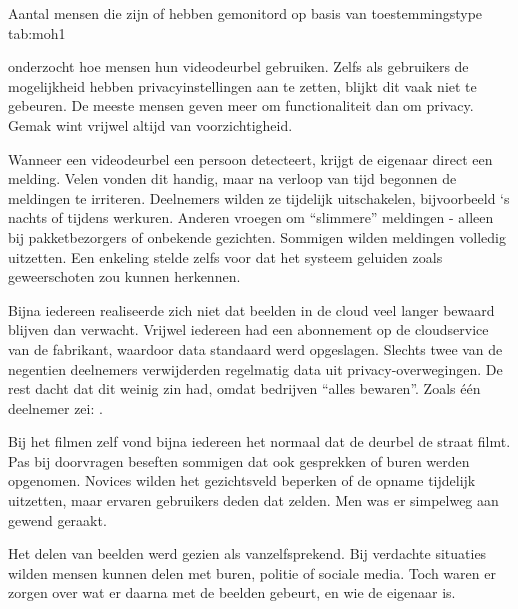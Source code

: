 \documentclass[nonacm, sigconf]{acmart}
\begin{document}
    \begin{SimpleTable}[s{0.3}s{0.3}s{0.3}s{0.3}]{Aantal mensen die zijn of hebben gemonitord op basis van toestemmingstype \parencite{moh2023characterizing}}{tab:moh1}
        \TableEmpty{}
    \end{SimpleTable}

    \parencite{tabassum2023exploring} onderzocht hoe mensen hun videodeurbel gebruiken.
    Zelfs als gebruikers de mogelijkheid hebben privacyinstellingen aan te zetten, blijkt dit vaak niet te gebeuren.
    De meeste mensen geven meer om functionaliteit dan om privacy.
    Gemak wint vrijwel altijd van voorzichtigheid.

    Wanneer een videodeurbel een persoon detecteert, krijgt de eigenaar direct een melding.
    Velen vonden dit handig, maar na verloop van tijd begonnen de meldingen te irriteren.
    Deelnemers wilden ze tijdelijk uitschakelen, bijvoorbeeld `s nachts of tijdens werkuren.
    Anderen vroegen om ``slimmere'' meldingen - alleen bij pakketbezorgers of onbekende gezichten.
    Sommigen wilden meldingen volledig uitzetten.
    Een enkeling stelde zelfs voor dat het systeem geluiden zoals geweerschoten zou kunnen herkennen.

    Bijna iedereen realiseerde zich niet dat beelden in de cloud veel langer bewaard blijven dan verwacht.
    Vrijwel iedereen had een abonnement op de cloudservice van de fabrikant, waardoor data standaard werd opgeslagen.
    Slechts twee van de negentien deelnemers verwijderden regelmatig data uit privacy-overwegingen.
    De rest dacht dat dit weinig zin had, omdat bedrijven ``alles bewaren''.
    Zoals één deelnemer zei:
    .

    Bij het filmen zelf vond bijna iedereen het normaal dat de deurbel de straat filmt.
    Pas bij doorvragen beseften sommigen dat ook gesprekken of buren werden opgenomen.
    Novices wilden het gezichtsveld beperken of de opname tijdelijk uitzetten, maar ervaren gebruikers deden dat zelden.
    Men was er simpelweg aan gewend geraakt.

    Het delen van beelden werd gezien als vanzelfsprekend.
    Bij verdachte situaties wilden mensen kunnen delen met buren, politie of sociale media.
    Toch waren er zorgen over wat er daarna met de beelden gebeurt, en wie de eigenaar is.
\end{document}
